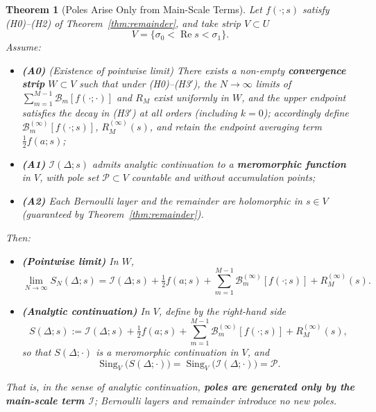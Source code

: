 \documentclass[11pt,a4paper]{article}
\newtheorem{theorem}{Theorem}[section]
\theoremstyle{remark}
\DeclareMathOperator{\Re}{Re}
\DeclareMathOperator{\Sing}{Sing}
\begin{document}
\begin{theorem}[Poles Arise Only from Main-Scale Terms]\label{thm:pole}
Let $f(\cdot;s)$ satisfy (H0)--(H2) of Theorem~\ref{thm:remainder}, and take strip $V\subset U$
\begin{equation}
V=\{\sigma_0<\Re s<\sigma_1\}.
\end{equation}
Assume:
\begin{itemize}
\item \textbf{(A0)} (Existence of pointwise limit) There exists a non-empty \textbf{convergence strip} $W\subset V$ such that under (H0)--(H3$'$), the $N\to\infty$ limits of $\sum_{m=1}^{M-1}\mathcal{B}_m[f(\cdot;\cdot)]$ and $R_M$ exist uniformly in $W$, and the upper endpoint satisfies the decay in (H3$'$) at all orders (including $k=0$); accordingly define $\mathcal{B}_m^{(\infty)}[f(\cdot;s)]$, $R_M^{(\infty)}(s)$, and retain the endpoint averaging term $\frac{1}{2} f(a;s)$;

\item \textbf{(A1)} $\mathcal{I}(\Delta;s)$ admits analytic continuation to a \textbf{meromorphic function} in $V$, with pole set $\mathcal{P}\subset V$ countable and without accumulation points;

\item \textbf{(A2)} Each Bernoulli layer and the remainder are holomorphic in $s\in V$ (guaranteed by Theorem~\ref{thm:remainder}).
\end{itemize}

Then:
\begin{itemize}
\item \textbf{(Pointwise limit)} In $W$,
\begin{equation}
\lim_{N\to\infty}S_N(\Delta;s)
=\mathcal{I}(\Delta;s)
+\tfrac{1}{2} f(a;s)
+\sum_{m=1}^{M-1}\mathcal{B}_m^{(\infty)}[f(\cdot;s)]
+R_M^{(\infty)}(s).
\end{equation}

\item \textbf{(Analytic continuation)} In $V$, define by the right-hand side
\begin{equation}
S(\Delta;s):=\mathcal{I}(\Delta;s)+\tfrac{1}{2} f(a;s)+\sum_{m=1}^{M-1}\mathcal{B}_m^{(\infty)}[f(\cdot;s)]+R_M^{(\infty)}(s),
\end{equation}
so that $S(\Delta;\cdot)$ is a meromorphic continuation in $V$, and
\begin{equation}
\Sing_V\bigl(S(\Delta;\cdot)\bigr)=\Sing_V\bigl(\mathcal{I}(\Delta;\cdot)\bigr)=\mathcal{P}.
\end{equation}
\end{itemize}

That is, in the sense of analytic continuation, \textbf{poles are generated only by the main-scale term $\mathcal{I}$}; Bernoulli layers and remainder introduce no new poles.
\end{theorem}
\end{document}
